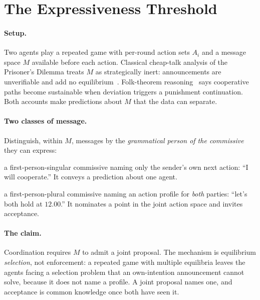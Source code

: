 \section{The Expressiveness Threshold}
\label{sec:model}

\paragraph{Setup.}
Two agents play a repeated game with per-round action sets $A_i$ and a message space
$M$ available before each action. Classical cheap-talk analysis of the Prisoner's
Dilemma treats $M$ as strategically inert: announcements are unverifiable and add no
equilibrium~\cite{crawford1982strategic}. Folk-theorem
reasoning~\cite{friedman1971noncooperative,fudenberg1986folk} says cooperative paths
become sustainable when deviation triggers a punishment continuation. Both accounts
make predictions about $M$ that the data can separate.

\paragraph{Two classes of message.}
Distinguish, within $M$, messages by the \emph{grammatical person of the commissive}
they can express:
\begin{description}[leftmargin=2.4em,style=nextline,itemsep=1pt,topsep=2pt]
\item[\textnormal{\textbf{Own intention}}] a first-person-singular commissive naming
only the sender's own next action: ``I will cooperate.'' It conveys a prediction about
one agent.
\item[\textnormal{\textbf{Joint proposal}}] a first-person-plural commissive naming an
action profile for \emph{both} parties: ``let's both hold at $12.00$.'' It nominates a
point in the joint action space and invites acceptance.
\end{description}

\paragraph{The claim.}
Coordination requires $M$ to admit a joint proposal. The mechanism is equilibrium
\emph{selection}, not enforcement: a repeated game with multiple equilibria leaves the
agents facing a selection problem that an own-intention announcement cannot solve,
because it does not name a profile. A joint proposal names one, and acceptance is
common knowledge once both have seen it.

